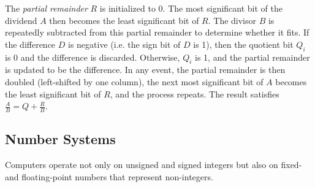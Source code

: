 \documentclass[12pt]{article}
\numberwithin{figure}{subsection}
\numberwithin{table}{subsection}
\numberwithin{equation}{subsection}
\begin{document}
\begin{enumerate}
  The \textit{partial remainder} $R$ is initialized to 0. The most significant bit of the dividend $A$ then becomes the least significant bit of $R$. The divisor $B$ is repeatedly subtracted from this partial remainder to determine whether it fits. If the difference $D$ is negative (i.e. the sign bit of $D$ is 1), then the quotient bit $Q_i$ is 0 and the difference is discarded. Otherwise, $Q_i$ is 1, and the partial remainder is updated to be the difference. In any event, the partial remainder is then doubled (left-shifted by one column), the next most significant bit of $A$ becomes the least significant bit of $R$, and the process repeats. The result satisfies $\frac{A}{B} = Q + \frac{R}{B}$.
\end{enumerate}

\subsection{Number Systems}

Computers operate not only on unsigned and signed integers but also on fixed- and floating-point numbers that represent non-integers.
\end{document}
